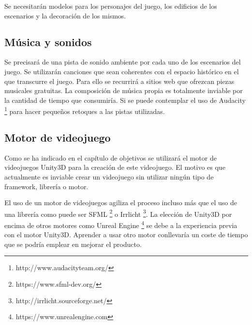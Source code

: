 Se necesitarán modelos para los personajes del juego, los edificios de los escenarios y la decoración de los mismos.

\subsection{Música y sonidos}

Se precisará de una pista de sonido ambiente por cada uno de los escenarios del juego. Se utilizarán canciones que sean coherentes con el espacio histórico en el que transcurre el juego. Para ello se recurrirá a sitios web que ofrezcan piezas musicales gratuitas. La composición de música propia es totalmente inviable por la cantidad de tiempo que consumiría. Si se puede contemplar el uso de Audacity \footnote{http://www.audacityteam.org/} para hacer pequeños retoques a las pistas utilizadas.

\subsection{Motor de videojuego}

Como se ha indicado en el capítulo de objetivos se utilizará el motor de videojuegos Unity3D para la creación de este videojuego. El motivo es que actualmente es inviable crear un videojuego sin utilizar ningún tipo de framework, librería o motor. 

El uso de un motor de videojuegos agiliza el proceso incluso más que el uso de una librería como puede ser SFML \footnote{https://www.sfml-dev.org/} o Irrlicht \footnote{http://irrlicht.sourceforge.net/}. La elección de Unity3D por encima de otros motores como Unreal Engine \footnote{https://www.unrealengine.com} se debe a la experiencia previa con el motor Unity3D. Aprender a usar otro motor conllevaría un coste de tiempo que se podría emplear en mejorar el producto.